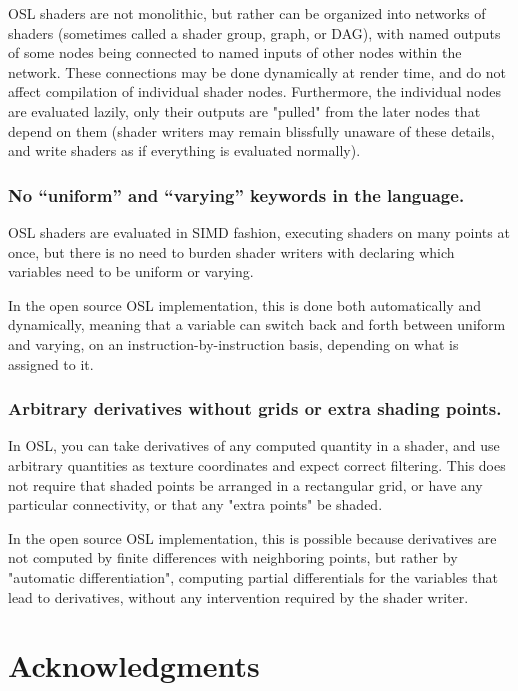 \documentclass[11pt,letterpaper]{book}
\begin{document}
  OSL shaders are not monolithic, but rather can be organized into
  networks of shaders (sometimes called a shader group, graph, or DAG),
  with named outputs of some nodes being connected to named inputs of
  other nodes within the network.  These connections may be done
  dynamically at render time, and do not affect compilation of
  individual shader nodes.  Furthermore, the individual nodes are
  evaluated lazily, only their outputs are "pulled" from the later nodes
  that depend on them (shader writers may remain blissfully unaware of
  these details, and write shaders as if everything is evaluated
  normally).

\subsubsection*{No ``uniform'' and ``varying'' keywords in the language.}

  OSL shaders are evaluated in SIMD fashion, executing shaders on many
  points at once, but there is no need to burden shader writers with
  declaring which variables need to be uniform or varying.  

  In the open source OSL implementation, this is done both automatically
  and dynamically, meaning that a variable can switch back and forth
  between uniform and varying, on an instruction-by-instruction basis,
  depending on what is assigned to it.

\subsubsection*{Arbitrary derivatives without grids or extra shading points.}

  In OSL, you can take derivatives of any computed quantity in a shader,
  and use arbitrary quantities as texture coordinates and expect correct
  filtering.  This does not require that shaded points be arranged in a
  rectangular grid, or have any particular connectivity, or that any
  "extra points" be shaded.  

  In the open source OSL implementation, this is possible because
  derivatives are not computed by finite differences with neighboring
  points, but rather by "automatic differentiation", computing partial
  differentials for the variables that lead to derivatives, without any
  intervention required by the shader writer.


\vspace{0.5in}


\section*{Acknowledgments}
\end{document}
